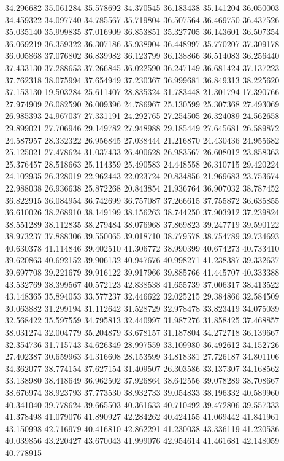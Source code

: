 34.296682
35.061284
35.578692
34.370545
36.183438
35.141204
36.050003
34.459322
34.097740
34.785567
35.719804
36.507564
36.469750
36.437526
35.035140
35.999835
37.016909
36.853851
35.327705
36.143601
36.507354
36.069219
36.359322
36.307186
35.938904
36.448997
35.770207
37.309178
36.005868
37.076802
36.839982
36.123799
36.138866
36.514083
36.256440
37.433130
37.288653
37.266845
36.022590
36.247149
36.681424
37.137223
37.762318
38.075994
37.654949
37.230367
36.999681
36.849313
38.225620
37.153130
19.503284
25.611407
28.835324
31.783448
21.301794
17.390766
27.974909
26.082590
26.009396
24.786967
25.130599
25.307368
27.493069
26.985393
24.967037
27.331191
24.292765
27.254505
26.324089
24.562658
29.899021
27.706946
29.149782
27.948988
29.185449
27.645681
26.589872
24.587957
28.332322
26.956845
27.038444
21.216870
24.430436
24.955682
25.125021
27.478624
31.037433
26.400628
26.983567
26.608012
23.858363
25.376457
28.518663
25.114359
25.490583
24.448558
26.310715
29.420224
24.102935
26.328019
22.962443
22.023724
20.834856
21.969683
23.753674
22.988038
26.936638
25.872268
20.843854
21.936764
36.907032
38.787452
36.822915
36.084954
36.742699
36.757087
37.266615
37.755872
36.635855
36.610026
38.268910
38.149199
38.156263
38.744250
37.903912
37.239824
38.551289
38.112835
38.279484
38.076968
37.869823
39.247719
39.590122
38.973237
37.888306
39.550065
39.018710
38.779578
38.754789
39.734693
40.630378
41.114846
39.402510
41.306772
38.990399
40.674273
40.733410
39.620863
40.692152
39.906132
40.947676
40.998271
41.238387
39.332637
39.697708
39.221679
39.916122
39.917966
39.885766
41.445707
40.333388
43.532769
38.399567
40.572123
42.838538
41.655739
37.006317
38.413522
43.148365
35.894053
33.577237
32.446622
32.025215
29.384866
32.584509
30.063882
31.299194
31.112642
31.528729
32.978478
33.823419
34.075039
32.568422
35.597559
34.795813
32.440997
31.987276
31.858425
37.468857
38.031274
32.004779
35.204879
33.678157
31.187804
34.272718
36.139667
32.354736
31.715743
34.626349
28.997559
33.109980
36.492612
34.152726
27.402387
30.659963
34.316608
28.153599
34.818381
27.726187
34.801106
34.362077
38.774154
37.627154
31.409507
26.303586
33.137307
34.168562
33.138980
38.418649
36.962502
37.926864
38.642556
39.078289
38.708667
38.676974
38.923793
37.773530
38.932733
39.054833
38.196332
40.589960
40.341040
39.778624
39.665503
40.361633
40.710492
39.472806
39.557333
41.378498
41.079076
41.890927
42.284262
40.424155
41.069442
41.841961
43.150998
42.716979
40.416810
42.862291
41.230038
43.336119
41.220536
40.039856
43.220427
43.670043
41.999076
42.954614
41.461681
42.148059
40.778915
